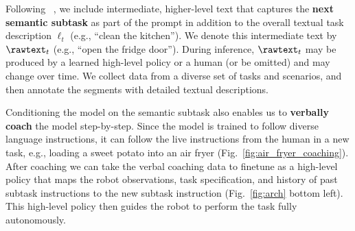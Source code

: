 
\label{subsec:hl}
Following \Pizf\ \cite{black2025pi05}, we include intermediate, higher-level text that captures the \textbf{next semantic subtask} as part of the prompt in addition to the overall textual task description $\ell_t$ (e.g., ``clean the kitchen''). We denote this intermediate text by $\rawtext_t$ (e.g., ``open the fridge door''). During inference, $\rawtext_t$ may be produced by a learned high-level policy or a human (or be omitted) and may change over time.
We collect data from a diverse set of tasks and scenarios, and then annotate the segments with detailed textual descriptions.

Conditioning the model on the semantic subtask also enables us to \textbf{verbally coach} the model step-by-step. Since the model is trained to follow diverse language instructions, it can follow the live instructions from the human in a new task, e.g., loading a sweet potato into an air fryer (Fig.~\ref{fig:air_fryer_coaching}). After coaching we can take the verbal coaching data to finetune \MethodName{} as a high-level policy that maps the robot observations, task specification, and history of past subtask instructions to the new subtask instruction (Fig.~\ref{fig:arch} bottom left). This high-level policy then guides the robot to perform the task fully autonomously.

